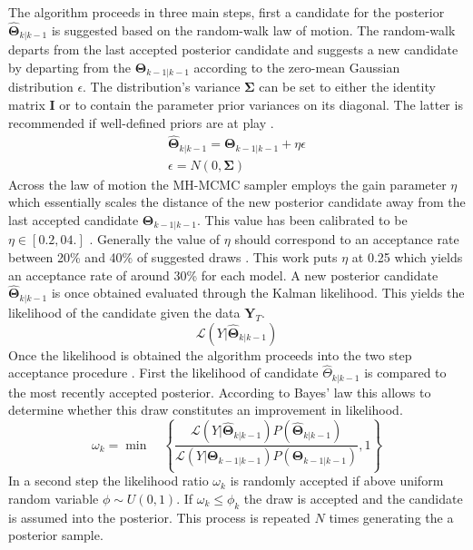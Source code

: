 \documentclass[12pt,a4paper,english]{article} %
\newcommand{\matr}[1]{\mathbf{#1}} %
\newcommand{\Lagr}{\mathcal{L}} %
\begin{document}
	The algorithm proceeds in three main steps, first a candidate for the posterior $\matr{\hat{\Theta}}_{k|k-1}$ is suggested based on the random-walk law of motion. The random-walk departs from the last accepted posterior candidate and suggests a new candidate by departing from the $\matr{\Theta}_{k-1|k-1}$ according to the zero-mean Gaussian distribution $\epsilon$. The distribution's variance $\matr{\Sigma}$ can be set to either the identity matrix $\matr{I}$ or to contain the parameter prior variances on its diagonal. The latter is recommended if well-defined priors are at play \cite{herbst_bayesian_2016}.
	\begin{equation}
		\begin{aligned}
			\matr{\hat{\Theta}}_{k|k-1} = \matr{\Theta}_{k-1|k-1} + \eta \epsilon \\
			\epsilon = N(0, \matr{\Sigma})
		\end{aligned}
	\end{equation}
	Across the law of motion the \ac{MH-MCMC} sampler employs the gain parameter $\eta$ which essentially scales the distance of the new posterior candidate away from the last accepted candidate $\matr{\Theta}_{k-1|k-1}$. This value has been calibrated to be $\eta \in [0.2, 04.]$ \cite{gelman_weak_1997}. Generally the value of $\eta$ should correspond to an acceptance rate between 20\% and 40\% of suggested draws \cite{herbst_bayesian_2016}. This work puts $\eta$ at 0.25 which yields an acceptance rate of around 30\% for each model.
	A new posterior candidate $\matr{\hat{\Theta}}_{k|k-1}$ is once obtained evaluated through the Kalman likelihood. This yields the likelihood of the candidate given the data $\matr{Y}_T$.
	\[
		 \Lagr(Y| \matr{\hat{\Theta}}_{k|k-1})
	\]
	Once the likelihood is obtained the algorithm proceeds into the two step acceptance procedure \cite{guerron-quintana_bayesian_2013}. First the likelihood of candidate $\hat{\Theta}_{k|k-1}$ is compared to the most recently accepted posterior. According to Bayes' law this allows to determine whether this draw constitutes an improvement in likelihood.	
	\begin{equation}
		\omega_k = \min \quad \left\{ \frac{ \Lagr(Y|\matr{\hat{\Theta}}_{k|k-1}) P(\matr{\hat{\Theta}}_{k|k-1})}{\Lagr(Y| \matr{\Theta}_{k-1|k-1})  P(\matr{\Theta}_{k-1|k-1})}, 1 \right\}
	\end{equation}
	In a second step the likelihood ratio $\omega_k$ is randomly accepted if above uniform random variable $\phi \sim U(0, 1)$. If $\omega_k \leq \phi_k$ the draw is accepted and the candidate is assumed into the posterior. This process is repeated $N$ times generating the a posterior sample. 
\end{document}
